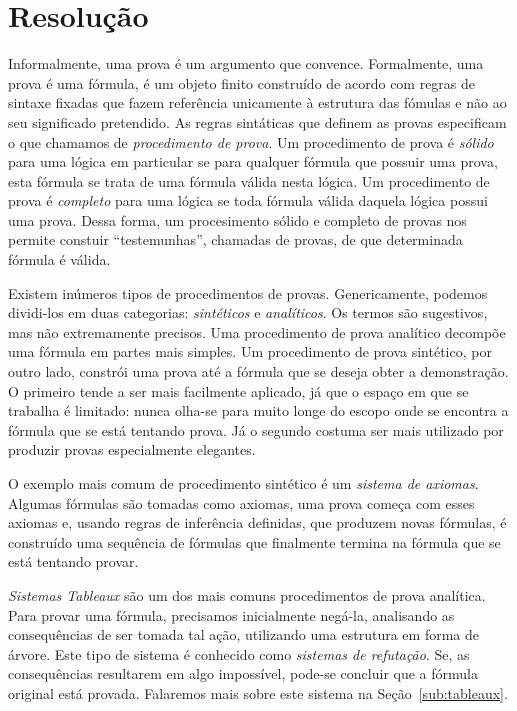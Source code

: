 \section{Resolução}
\label{sec:resolucao}
Informalmente, uma prova é um argumento que convence. Formalmente, uma prova é
uma fórmula, é um objeto finito construído de acordo com regras de sintaxe
fixadas que fazem referência unicamente à estrutura das fómulas e não ao seu
significado pretendido. As regras sintáticas que definem as provas especificam o
que chamamos de \textit{procedimento de prova}.
Um procedimento de prova é \textit{sólido} para uma lógica em particular se
para qualquer fórmula que possuir uma prova, esta fórmula se trata de uma
fórmula válida nesta lógica. Um procedimento de prova é \textit{completo} para
uma lógica se toda fórmula válida daquela lógica possui uma prova. Dessa forma,
um procesimento sólido e completo de provas nos permite constuir
``testemunhas'', chamadas de provas, de que determinada fórmula é válida.

Existem inúmeros tipos de procedimentos de provas. Genericamente, podemos
dividi-los em duas categorias: \textit{sintéticos} e \textit{analíticos}. Os
termos são sugestivos, mas não extremamente precisos. Uma procedimento de prova
analítico decompõe uma fórmula em partes mais simples. Um procedimento de prova
sintético, por outro lado, constrói uma prova até a fórmula que se deseja obter a
demonstração.
O primeiro tende a ser mais facilmente aplicado, já que o espaço em que se
trabalha é limitado: nunca olha-se para muito longe do escopo onde se encontra a
fórmula que se está tentando prova. Já o segundo costuma ser mais utilizado por
produzir provas especialmente elegantes.

O exemplo mais comum de procedimento sintético é um \textit{sistema de axiomas}.
Algumas fórmulas são tomadas como axiomas, uma prova começa com esses axiomas e,
usando regras de inferência definidas, que produzem novas fórmulas, é construído
uma sequência de fórmulas que finalmente termina na fórmula que se está tentando
provar.

\textit{Sistemas Tableaux} são um dos mais comuns procedimentos de prova
analítica. Para provar uma fórmula, precisamos inicialmente negá-la, analisando
as consequências de ser tomada tal ação, utilizando uma estrutura em forma de
árvore. Este tipo de sistema é conhecido como \textit{sistemas de refutação}.
Se, as consequências resultarem em algo impossível, pode-se concluir que a
fórmula original está provada. Falaremos mais sobre este sistema na
Seção~\ref{sub:tableaux}.


